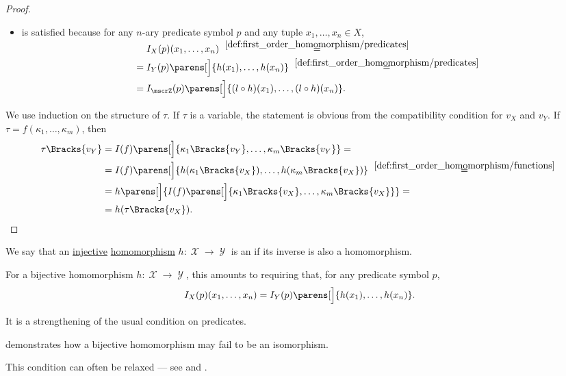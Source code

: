 \begin{proof}
\begin{itemize}
    \item {} is satisfied because for any \( n \)-ary predicate symbol \( p \) and any tuple \( x_1, \ldots, x_n \in X \),
    \begin{align*}
      &\phantom{{}={}}
      I_X(p) (x_1, \ldots, x_n)
      \reloset {\ref{def:first_order_homomorphism/predicates}} = \\ &=
      I_Y(p) \parens[\Big]{ h(x_1), \ldots, h(x_n) }
      \reloset {\ref{def:first_order_homomorphism/predicates}} = \\ &=
      I_{\mscrZ}(p) \parens[\Big]{ (l \bincirc h)(x_1), \ldots, (l \bincirc h)(x_n) }.
    \end{align*}
  \end{itemize}

   We use induction on the structure of \( \tau \). If \( \tau \) is a variable, the statement is obvious from the compatibility condition for \( v_X \) and \( v_Y \). If \( \tau = f(\kappa_1, \ldots, \kappa_m) \), then
  \begin{align*}
    \tau\Bracks{v_Y}
    &=
    I(f) \parens[\Big]{ \kappa_1\Bracks{v_Y}, \ldots, \kappa_m\Bracks{v_Y} }
    = \\ &=
    I(f) \parens[\Big]{ h(\kappa_1\Bracks{v_X}), \ldots, h(\kappa_m\Bracks{v_X}) }
    \reloset {\ref{def:first_order_homomorphism/functions}} = \\ &=
    h\parens[\Big]{ I(f) \parens[\Big]{ \kappa_1\Bracks{v_X}, \ldots, \kappa_m\Bracks{v_X} } }
    = \\ &=
    h(\tau\Bracks{v_X}).
  \end{align*}
\end{proof}

\begin{definition}\label{def:first_order_isomorphism}
  We say that an \hyperref[def:function_invertibility/injective]{injective} \hyperref[def:first_order_homomorphism]{homomorphism} \( h: \mscrX \to \mscrY \) is an  if its inverse is also a homomorphism.

  For a bijective homomorphism \( h: \mscrX \to \mscrY \), this amounts to requiring that, for any predicate symbol \( p \),
  \begin{equation*}
    I_X(p) (x_1, \ldots, x_n) = I_Y(p) \parens[\Big]{ h(x_1), \ldots, h(x_n) }.
  \end{equation*}

  It is a strengthening of the usual condition  on predicates.
\end{definition}
\begin{comments}
  \item {} demonstrates how a bijective homomorphism may fail to be an isomorphism.

  \item This condition can often be relaxed --- see  and .
\end{comments}


